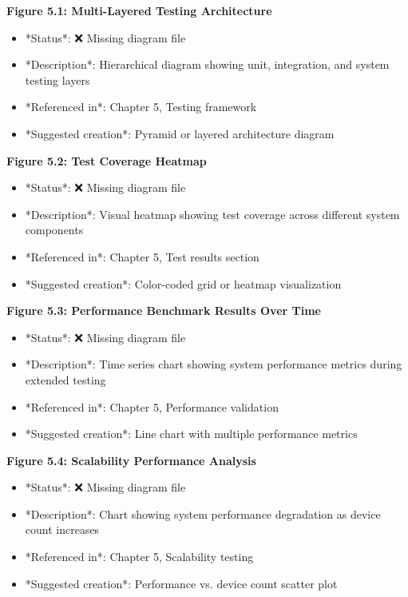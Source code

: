\documentclass[12pt,a4paper]{article}
\begin{document}
{{\textbf{Figure 5.1: Multi-Layered Testing Architecture}

\begin{itemize}
\item *Status*: ❌ Missing diagram file
\item *Description*: Hierarchical diagram showing unit, integration, and system testing layers
\item *Referenced in*: Chapter 5, Testing framework
\item *Suggested creation*: Pyramid or layered architecture diagram

\end{itemize}
\textbf{Figure 5.2: Test Coverage Heatmap}

\begin{itemize}
\item *Status*: ❌ Missing diagram file
\item *Description*: Visual heatmap showing test coverage across different system components
\item *Referenced in*: Chapter 5, Test results section
\item *Suggested creation*: Color-coded grid or heatmap visualization

\end{itemize}
\textbf{Figure 5.3: Performance Benchmark Results Over Time}

\begin{itemize}
\item *Status*: ❌ Missing diagram file
\item *Description*: Time series chart showing system performance metrics during extended testing
\item *Referenced in*: Chapter 5, Performance validation
\item *Suggested creation*: Line chart with multiple performance metrics

\end{itemize}
\textbf{Figure 5.4: Scalability Performance Analysis}

\begin{itemize}
\item *Status*: ❌ Missing diagram file
\item *Description*: Chart showing system performance degradation as device count increases
\item *Referenced in*: Chapter 5, Scalability testing
\item *Suggested creation*: Performance vs. device count scatter plot


\end{itemize}}}
\end{document}
